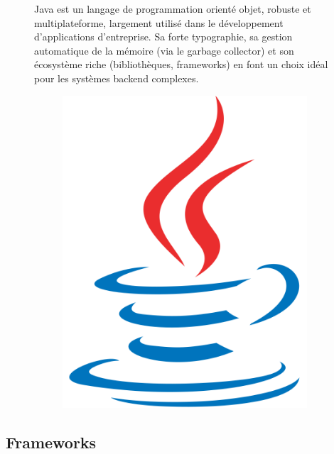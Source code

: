 \documentclass[12pt,a4paper]{report}
\begin{document}
	\begin{figure}[H]
		\begin{minipage}{0.8\textwidth}
			Java est un langage de programmation orienté objet, robuste et multiplateforme, largement utilisé dans le développement d'applications d'entreprise. Sa forte typographie, sa gestion automatique de la mémoire (via le garbage collector) et son écosystème riche (bibliothèques, frameworks) en font un choix idéal pour les systèmes backend complexes.
		\end{minipage}
		\hfill
		\begin{minipage}{0.15\textwidth}
			\begin{figure}[H]
				\centering
				\includegraphics[width=\linewidth]{java-logo.png}
				\label{fig:java-logo}
			\end{figure}			
		\end{minipage}
	\end{figure}
	
	\subsection{Frameworks}
	
\end{document}

